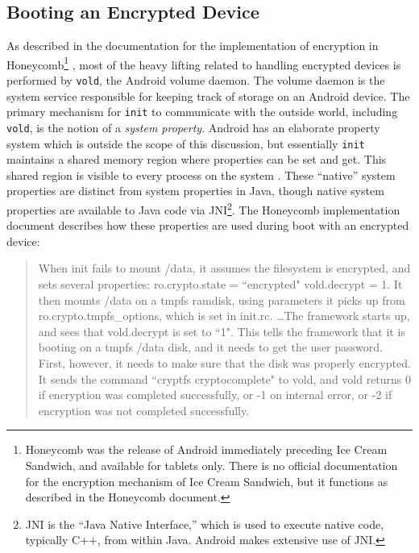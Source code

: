 \subsection{Booting an Encrypted Device} \label{ssec:encryptionboot}

As described in the documentation for the implementation of encryption in Honeycomb\footnote{Honeycomb was the release of Android
immediately preceding Ice Cream Sandwich, and available for tablets only. There is no official documentation for the encryption
mechanism of Ice Cream Sandwich, but it functions as described in the Honeycomb document.} \cite{honeycombcrypt}, most of the heavy
lifting related to handling encrypted devices is performed by \texttt{vold}, the Android volume daemon. The volume daemon is the
system service responsible for keeping track of storage on an Android device. The primary mechanism for \texttt{init} to communicate
with the outside world, including \texttt{vold}, is the notion of a \emph{system property}.  Android has an elaborate property system
which is outside the scope of this discussion, but essentially \texttt{init} maintains a shared memory region where properties can
be set and get. This shared region is visible to every process on the system \cite{propertysystem}. These ``native'' system
properties are distinct from system properties in Java, though native system properties are available to Java code via
JNI\footnote{JNI is the ``Java Native Interface,'' which is used to execute native code, typically C++, from within Java. Android
makes extensive use of JNI.}. The Honeycomb implementation document describes how these properties are used during boot with an
encrypted device:

\begin{quote} When init fails to mount /data, it assumes the filesystem is encrypted, and sets several properties: ro.crypto.state =
``encrypted" vold.decrypt = 1. It then mounts /data on a tmpfs ramdisk, using parameters it picks up from ro.crypto.tmpfs\_options,
which is set in init.rc.  \ldots The framework starts up, and sees that vold.decrypt is set to ``1". This tells the framework that it
is booting on a tmpfs /data disk, and it needs to get the user password. First, however, it needs to make sure that the disk was
properly encrypted. It sends the command ``cryptfs cryptocomplete" to vold, and vold returns 0 if encryption was completed
successfully, or -1 on internal error, or -2 if encryption was not completed successfully.  

\hspace{\fill}\cite{honeycombcrypt}
\end{quote}

